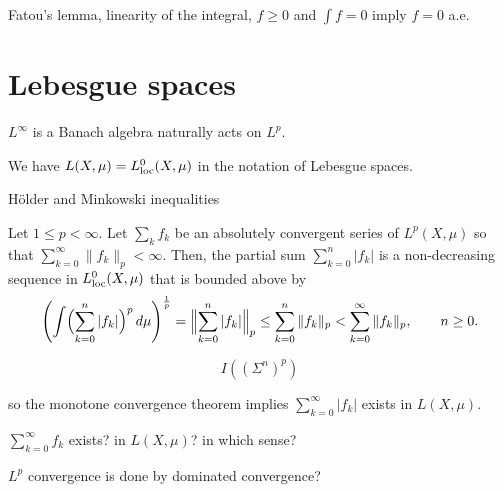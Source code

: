 \documentclass{../../large}
\begin{document}
\begin{prb}
Fatou's lemma, linearity of the integral, $f\ge0$ and $\int f=0$ imply $f=0$ a.e.
\end{prb}




\begin{prb}
\end{prb}





\section{Lebesgue spaces}

$L^\infty$ is a Banach algebra naturally acts on $L^p$.

We have $L(X,\mu)=L_{\mathrm{loc}}^0(X,\mu)$ in the notation of Lebesgue spaces.

\begin{prb}
H\"older and Minkowski inequalities
\end{prb}

\begin{prb}[Completeness]
\end{prb}
\begin{pf}
Let $1\le p<\infty$.
Let $\sum_kf_k$ be an absolutely convergent series of $L^p(X,\mu)$ so that $\sum_{k=0}^\infty\|f_k\|_p<\infty$.
Then, the partial sum $\sum_{k=0}^n|f_k|$ is a non-decreasing sequence in $L_{\mathrm{loc}}^0(X,\mu)$ that is bounded above by
\[\left(\int\Bigl(\sum_{k=0}^n|f_k|\Bigr)^p\,d\mu\right)^{\frac1p}=\Bigl\|\sum_{k=0}^n|f_k|\Bigr\|_p\le\sum_{k=0}^n\|f_k\|_p<\sum_{k=0}^\infty\|f_k\|_p,\qquad n\ge0.\]

\[I((\Sigma^n)^p)\]

so the monotone convergence theorem implies $\sum_{k=0}^\infty|f_k|$ exists in $L(X,\mu)$.

$\sum_{k=0}^\infty f_k$ exists? in $L(X,\mu)$? in which sense?

$L^p$ convergence is done by dominated convergence?



\end{pf}
\end{document}
